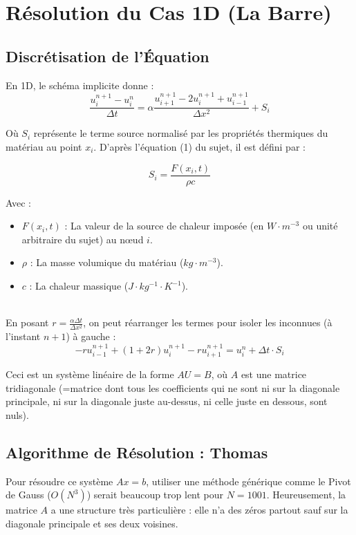 \documentclass[a4paper,12pt]{article}
\begin{document}
\section{Résolution du Cas 1D (La Barre)}

\subsection{Discrétisation de l'Équation}
En 1D, le schéma implicite donne :
$$ \frac{u_i^{n+1} - u_i^n}{\Delta t} = \alpha \frac{u_{i+1}^{n+1} - 2u_i^{n+1} + u_{i-1}^{n+1}}{\Delta x^2} + S_i $$


Où $S_i$ représente le terme source normalisé par les propriétés thermiques du matériau au point $x_i$. D'après l'équation (1) du sujet, il est défini par :

\begin{equation}
    S_i = \frac{F(x_i, t)}{\rho c}
\end{equation}

Avec :
\begin{itemize}
    \item $F(x_i, t)$ : La valeur de la source de chaleur imposée (en $W \cdot m^{-3}$ ou unité arbitraire du sujet) au nœud $i$.
    \item $\rho$ : La masse volumique du matériau ($kg \cdot m^{-3}$).
    \item $c$ : La chaleur massique ($J \cdot kg^{-1} \cdot K^{-1}$).
\end{itemize}\\



En posant $r = \frac{\alpha \Delta t}{\Delta x^2}$, on peut réarranger les termes pour isoler les inconnues (à l'instant $n+1$) à gauche :
$$ -r u_{i-1}^{n+1} + (1 + 2r) u_i^{n+1} - r u_{i+1}^{n+1} = u_i^n + \Delta t \cdot S_i $$

Ceci est un système linéaire de la forme $A U = B$, où $A$ est une matrice tridiagonale (=matrice dont tous les coefficients qui ne sont ni sur la diagonale principale, ni sur la diagonale juste au-dessus, ni celle juste en dessous, sont nuls).

\subsection{Algorithme de Résolution : Thomas}
Pour résoudre ce système $Ax=b$, utiliser une méthode générique comme le Pivot de Gauss ($O(N^3)$) serait beaucoup trop lent pour $N=1001$. Heureusement, la matrice $A$ a une structure très particulière : elle n'a des zéros partout sauf sur la diagonale principale et ses deux voisines.
\end{document}
